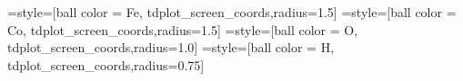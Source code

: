 





 =style=[ball color = Fe,
tdplot_screen_coords,radius=1.5]
 =style=[ball color = Co,
tdplot_screen_coords,radius=1.5]
 =style=[ball color = O,
tdplot_screen_coords,radius=1.0]
 =style=[ball color = H,
tdplot_screen_coords,radius=0.75]


\newcommand{\drawFeAtom}[3]{
      \shade[FeAtom](#1,#2,#3) circle;} 
\newcommand{\drawCoAtom}[3]{   
      \shade[CoAtom](#1,#2,#3) circle;}

\newcommand{\drawCAtom}[3]{    
      \shade[CAtom](#1,#2,#3) circle;} 
\newcommand{\drawHAtom}[3]{   
      \shade[HAtom](#1,#2,#3) circle;}
\newcommand{\drawOAtom}[3]{   
      \shade[OAtom](#1,#2,#3) circle;}    
\newcommand{\drawNAtom}[3]{   
      \shade[NAtom](#1,#2,#3) circle;}       
\newcommand{\drawPAtom}[3]{   
      \shade[PAtom](#1,#2,#3) circle;}     
\newcommand{\drawSAtom}[3]{    
      \shade[SAtom](#1,#2,#3) circle;}           
      
      
      
      
      
